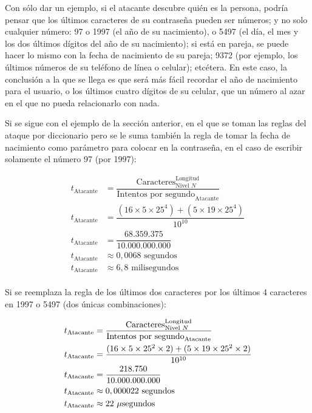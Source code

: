 \documentclass[12pt,a4paper,twoside]{book}
\begin{document}
Con sólo dar un ejemplo, si el atacante descubre quién es la persona, podría pensar que los últimos caracteres de su contraseña pueden ser números; y no solo cualquier número: 97 o 1997 (el año de su nacimiento), o 5497 (el día, el mes y los dos últimos dígitos del año de su nacimiento); si está en pareja, se puede hacer lo mismo con la fecha de nacimiento de su pareja; 9372 (por ejemplo, los últimos números de su teléfono de línea o celular); etcétera. En este caso, la conclusión a la que se llega es que será más fácil recordar el año de nacimiento para el usuario, o los últimos cuatro dígitos de su celular, que un número al azar en el que no pueda relacionarlo con nada.

Si se sigue con el ejemplo de la sección anterior, en el que se toman las reglas del ataque por diccionario pero se le suma también la regla de tomar la fecha de nacimiento como parámetro para colocar en la contraseña, en el caso de escribir solamente el número 97 (por 1997):

\begin{align*}
t_{\text{Atacante}} &= \dfrac{\text{Caracteres}^{\text{Longitud}}_{\text{Nivel } N}}{\text{Intentos por segundo}_\text{Atacante}} \\
t_{\text{Atacante}} &= \dfrac{(16 \times 5 \times 25^{4}) + (5 \times 19 \times 25^{4})}{10^{10}} \\
t_{\text{Atacante}} &= \dfrac{68.359.375}{10.000.000.000} \\
t_{\text{Atacante}} &\approx 0,0068 \text{ segundos} \\
t_{\text{Atacante}} &\approx 6,8 \text{ milisegundos} \\
\end{align*}

Si se reemplaza la regla de los últimos dos caracteres por los últimos 4 caracteres en 1997 o 5497 (dos únicas combinaciones):

\begin{align*}
t_{\text{Atacante}} &= \dfrac{\text{Caracteres}^{\text{Longitud}}_{\text{Nivel } N}}{\text{Intentos por segundo}_\text{Atacante}} \\
t_{\text{Atacante}} &= \dfrac{(16 \times 5 \times 25^{2} \times 2) + (5 \times 19 \times 25^{2} \times 2)}{10^{10}} \\
t_{\text{Atacante}} &= \dfrac{218.750}{10.000.000.000} \\
t_{\text{Atacante}} &\approx 0,000022 \text{ segundos} \\
t_{\text{Atacante}} &\approx 22 \text{ $ \mu $segundos} \\
\end{align*}
\end{document}
